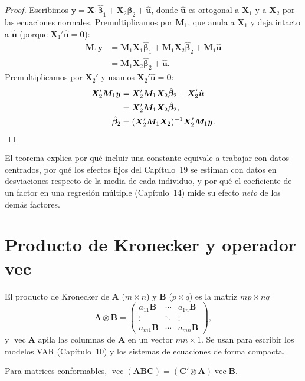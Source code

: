 \begin{proof}
Escribimos $\bm y=\bm X_1\hat{\bm\beta}_1+\bm X_2\hat{\bm\beta}_2+\hat{\bm u}$, donde $\hat{\bm u}$ es
ortogonal a $\bm X_1$ y a $\bm X_2$ por las ecuaciones normales. Premultiplicamos por $\bm M_1$, que anula
a $\bm X_1$ y deja intacto a $\hat{\bm u}$ (porque $\bm X_1'\hat{\bm u}=\bm0$):
\begin{align*}
  \bm M_1\bm y &= \bm M_1\bm X_1\hat{\bm\beta}_1+\bm M_1\bm X_2\hat{\bm\beta}_2+\bm M_1\hat{\bm u}\\
               &= \bm M_1\bm X_2\hat{\bm\beta}_2+\hat{\bm u}.
\end{align*}
Premultiplicamos por $\bm X_2'$ y usamos $\bm X_2'\hat{\bm u}=\bm0$:
\begin{align*}
  \bm X_2'\bm M_1\bm y &= \bm X_2'\bm M_1\bm X_2\hat{\bm\beta}_2+\bm X_2'\hat{\bm u}\\
                       &= \bm X_2'\bm M_1\bm X_2\hat{\bm\beta}_2,\\
  \hat{\bm\beta}_2     &= (\bm X_2'\bm M_1\bm X_2)^{-1}\bm X_2'\bm M_1\bm y . \qedhere
\end{align*}
\end{proof}

El teorema explica por qué incluir una constante equivale a trabajar con datos centrados, por qué los
efectos fijos del Capítulo~19 se estiman con datos en desviaciones respecto de la media de cada
individuo, y por qué el coeficiente de un factor en una regresión múltiple (Capítulo~14) mide su efecto
\emph{neto} de los demás factores.

\section{Producto de Kronecker y operador vec}

El producto de Kronecker de $\bm A$ ($m\times n$) y $\bm B$ ($p\times q$) es la matriz $mp\times nq$
\[
  \bm A\otimes\bm B=\begin{pmatrix}a_{11}\bm B&\cdots&a_{1n}\bm B\\ \vdots&\ddots&\vdots\\
                    a_{m1}\bm B&\cdots&a_{mn}\bm B\end{pmatrix},
\]
y $\operatorname{vec}\bm A$ apila las columnas de $\bm A$ en un vector $mn\times1$. Se usan para escribir
los modelos VAR (Capítulo~10) y los sistemas de ecuaciones de forma compacta.

\begin{proposicion}\label{prop:ap-vec}
Para matrices conformables, $\operatorname{vec}(\bm A\bm B\bm C)=(\bm C'\otimes\bm A)\operatorname{vec}\bm B$.
\end{proposicion}

